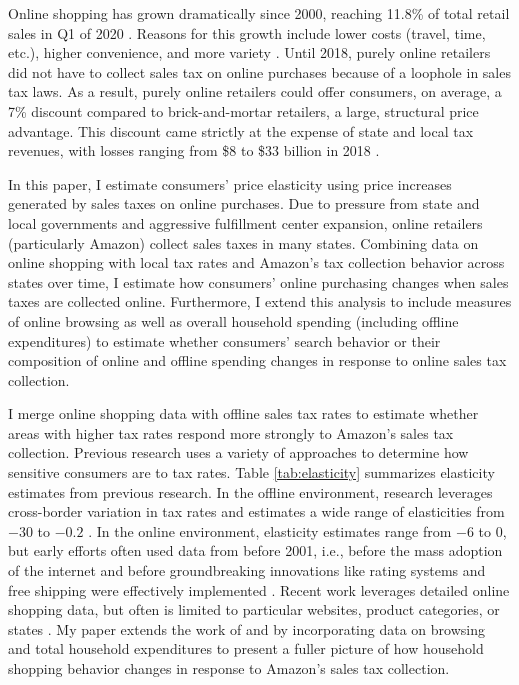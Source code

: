 \documentclass[AEJ,reviewmode]{AEA}
\begin{document}
Online shopping has grown dramatically since 2000, reaching 11.8\% of total retail sales in Q1 of 2020 \citep{CensusECom}. Reasons for this growth include lower costs (travel, time, etc.), higher convenience, and more variety \citep{forbes2013, powerRetail}. Until 2018, purely online retailers did not have to collect sales tax on online purchases because of a loophole in sales tax laws. As a result, purely online retailers could offer consumers, on average, a 7\% discount compared to brick-and-mortar retailers, a large, structural price advantage. This discount came strictly at the expense of state and local tax revenues, with losses ranging from \$8 to \$33 billion in 2018 \citep{wayfair2018}.

In this paper, I estimate consumers' price elasticity using price increases generated by sales taxes on online purchases. Due to pressure from state and local governments and aggressive fulfillment center expansion, online retailers (particularly Amazon) collect sales taxes in many states. Combining data on online shopping with local tax rates and Amazon's tax collection behavior across states over time, I estimate how consumers' online purchasing changes when sales taxes are collected online. Furthermore, I extend this analysis to include measures of online browsing as well as overall household spending (including offline expenditures) to estimate whether consumers' search behavior or their composition of online and offline spending changes in response to online sales tax collection.

I merge online shopping data with offline sales tax rates to estimate whether areas with higher tax rates respond more strongly to Amazon's sales tax collection. Previous research uses a variety of approaches to determine how sensitive consumers are to tax rates. Table \ref{tab:elasticity} summarizes elasticity estimates from previous research. In the offline environment, research leverages cross-border variation in tax rates and estimates a wide range of elasticities from $-30$ to $-0.2$ \citep{asplundFribergWilander2007, agarwal2017b, davis2011, agarwal2017a, mikesell1970}. In the online environment, elasticity estimates range from $-6$ to 0, but early efforts often used data from before 2001, i.e., before the mass adoption of the internet and before groundbreaking innovations like rating systems and free shipping were effectively implemented \citep{scanlan2007, ballardLee2007, almMelnik2005, goolsbee2000}. Recent work leverages detailed online shopping data, but often is limited to particular websites, product categories, or states \citep{einavEtAl2014, Anderson2010, Ellison2009, Hu201484}. My paper extends the work of \citet{baughBenDavidPark2016} and \citet{houdeNewberrySeim2016} by incorporating data on browsing and total household expenditures to present a fuller picture of how household shopping behavior changes in response to Amazon's sales tax collection.
\end{document}

